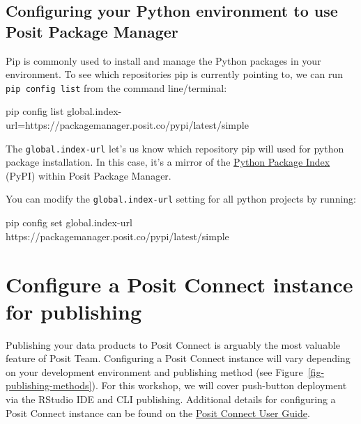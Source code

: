 \documentclass[
  letterpaper,
  DIV=11,
  numbers=noendperiod]{scrreprt}
\newenvironment{Shaded}{\begin{snugshade}}{\end{snugshade}}
\newcommand{\ExtensionTok}[1]{\textcolor[rgb]{0.00,0.23,0.31}{#1}}
\newcommand{\NormalTok}[1]{\textcolor[rgb]{0.00,0.23,0.31}{#1}}
\newcommand{\StringTok}[1]{\textcolor[rgb]{0.13,0.47,0.30}{#1}}
\begin{document}
\subsection{Configuring your Python environment to use Posit Package
Manager}\label{configuring-your-python-environment-to-use-posit-package-manager}

Pip is commonly used to install and manage the Python packages in your
environment. To see which repositories pip is currently pointing to, we
can run \texttt{pip\ config\ list} from the command line/terminal:

\begin{Shaded}
\begin{Highlighting}[]
\ExtensionTok{pip}\NormalTok{ config list}
\ExtensionTok{global.index{-}url=}\StringTok{\textquotesingle{}https://packagemanager.posit.co/pypi/latest/simple\textquotesingle{}}
\end{Highlighting}
\end{Shaded}

The \texttt{global.index-url} let's us know which repository pip will
used for python package installation. In this case, it's a mirror of the
\href{https://pypi.org/}{Python Package Index} (PyPI) within Posit
Package Manager.

You can modify the \texttt{global.index-url} setting for all python
projects by running:

\begin{Shaded}
\begin{Highlighting}[]
\ExtensionTok{pip}\NormalTok{ config set global.index{-}url https://packagemanager.posit.co/pypi/latest/simple}
\end{Highlighting}
\end{Shaded}

\section{Configure a Posit Connect instance for
publishing}\label{configure-a-posit-connect-instance-for-publishing}

Publishing your data products to Posit Connect is arguably the most
valuable feature of Posit Team. Configuring a Posit Connect instance
will vary depending on your development environment and publishing
method (see Figure~\ref{fig-publishing-methods}). For this workshop, we
will cover push-button deployment via the RStudio IDE and CLI
publishing. Additional details for configuring a Posit Connect instance
can be found on the
\href{https://docs.posit.co/connect/user/publishing-rstudio/}{Posit
Connect User Guide}.
\end{document}
